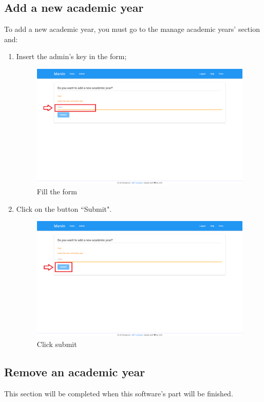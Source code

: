 \documentclass[ManualeUtente]{subfiles}
\begin{document}
\subsection{Add a new academic year}
To add a new academic year, you must go to the manage academic years' section and:
\begin{enumerate}
	\item Insert the admin's key in the form;
	\begin{figure}[H]
		\centering
		\includegraphics[width=0.7\linewidth]{image/UniversityAddYear1}
		\caption[Add year form]{Fill the form}
		\label{fig:Add a new academic year, fill the form}
	\end{figure}
	\item Click on the button ``Submit".
	\begin{figure}[H]
		\centering
		\includegraphics[width=0.7\linewidth]{image/UniversityAddYear2}
		\caption[Add year submit]{Click submit}
		\label{fig:Add a new academic year, click submit}
	\end{figure}
\end{enumerate}

\subsection{Remove an academic year}
This section will be completed when this software's part will be finished.
\end{document}

